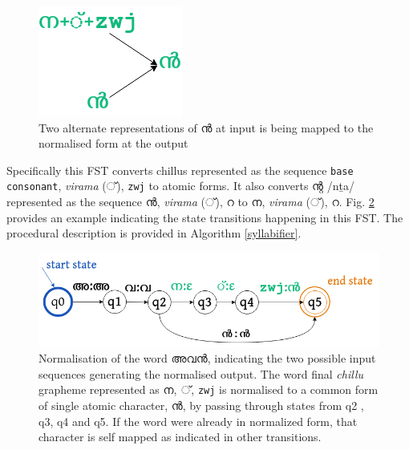 \documentclass{ieeeaccess}
\begin{document}
\begin{figure}[h]
	\centering
	\includegraphics[width=0.4\linewidth]{norm.drawio.png}
	\caption{Two alternate representations of {\mal ൻ} at input is being mapped to the normalised form at the output}
	\label{norm}
\end{figure}

Specifically this FST converts chillus represented as the sequence \texttt{base consonant},  \textit{virama} ({\mal ്}), \texttt{zwj} to atomic forms. It also converts {\mal ന്റ} {\ipa /nṯa/} represented as the sequence {\mal ൻ}, \textit{virama} ({\mal ്}), {\mal റ} to {\mal ന},  \textit{virama} ({\mal ്}), {\mal റ}. Fig. \ref{egnorm} provides an example indicating the state transitions happening in this FST. The procedural description is provided in Algorithm \ref{syllabifier}.


\begin{figure}[h]
	\centering
	\includegraphics[width=\linewidth]{egs_norm.png}
	\caption{Normalisation of the word {\mal അവൻ}, indicating the two possible input sequences generating the normalised output. The word final \textit{chillu} grapheme represented as {\mal ന, ്,} \texttt{zwj} is normalised to a common form of single atomic character, {\mal ൻ},  by passing through states from q2 , q3, q4 and q5. If the word were already in normalized form, that character is self mapped as indicated in other transitions.}
	\label{egnorm}
\end{figure}
\end{document}
